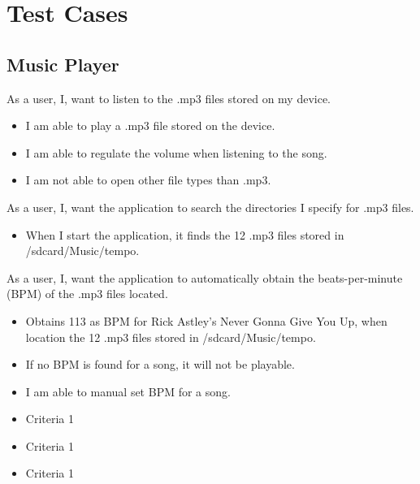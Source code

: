 \section{Test Cases}
\subsection{Music Player}
{As a user, I, want to listen to the .mp3 files stored on my device.}
{\begin{itemize}
\item I am able to play a .mp3 file stored on the device.
\item I am able to regulate the volume when listening to the song.
\item I am not able to open other file types than .mp3.
\end{itemize}}

{As a user, I, want the application to search the directories I specify for .mp3 files.}
{\begin{itemize}
\item When I start the application, it finds the 12 .mp3 files stored in /sdcard/Music/tempo.
\end{itemize}}

{As a user, I, want the application to automatically obtain the beats-per-minute (BPM) of the .mp3 files located.}
{\begin{itemize}
\item Obtains 113 as BPM for Rick Astley's Never Gonna Give You Up, when location the 12 .mp3 files stored in /sdcard/Music/tempo.
\item If no BPM is found for a song, it will not be playable.
\item I am able to manual set BPM for a song.
\end{itemize}}

{ }
{\begin{itemize}
\item Criteria 1
\end{itemize}}

{ }
{\begin{itemize}
\item Criteria 1
\end{itemize}}

{ }
{\begin{itemize}
\item Criteria 1
\end{itemize}}

